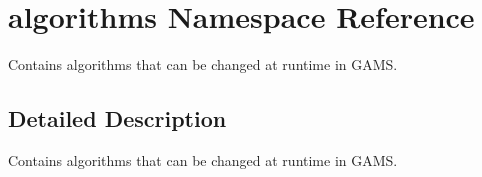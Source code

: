 \hypertarget{namespacealgorithms}{}\section{algorithms Namespace Reference}
\label{namespacealgorithms}


Contains algorithms that can be changed at runtime in G\+A\+MS.  




\subsection{Detailed Description}
Contains algorithms that can be changed at runtime in G\+A\+MS. 
